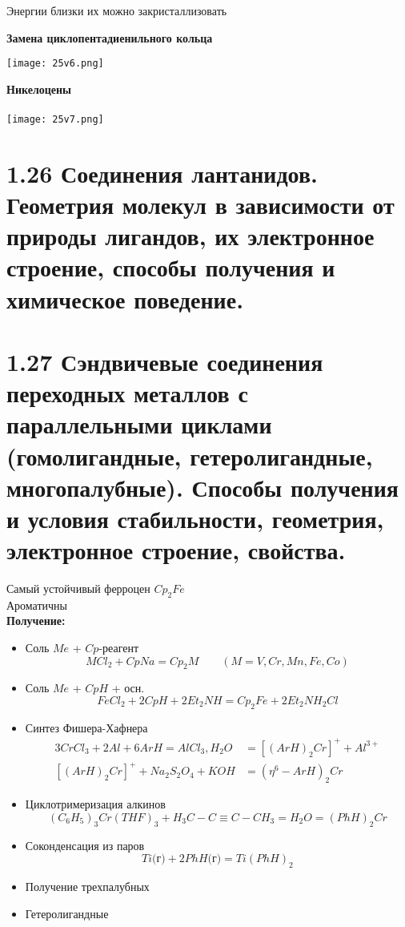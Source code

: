 Энергии близки их можно закристаллизовать

\textbf{Замена циклопентадиенильного кольца}

\texttt{[image: 25v6.png]}

\textbf{Никелоцены}\\
\\

\texttt{[image: 25v7.png]}

\section*{1.26 Соединения лантанидов. Геометрия молекул в зависимости от природы лигандов, их электронное строение, способы получения и химическое поведение.}

\section*{1.27 Сэндвичевые соединения переходных металлов с параллельными циклами (гомолигандные, гетеролигандные, многопалубные). Способы получения и условия стабильности, геометрия, электронное строение, свойства.}
\begin{figure} [H]
	\centering {\texttt{[image: xx1]}}
\end{figure}
Самый устойчивый ферроцен $Cp_2Fe$ \\
Ароматичны \\
\textbf{Получение:}\\
\begin{itemize}
	\item Соль $Me$ + $Cp$-реагент
	\[
	MCl_2 + CpNa = Cp_2M \qquad (M = V, Cr, Mn, Fe, Co)
	\]
	\item Соль $Me$ + $CpH$ + осн.
	\[
	FeCl_2 + 2CpH + 2Et_2NH = Cp_2Fe + 2Et_2NH_2Cl
	\]
	\item Синтез Фишера-Хафнера
	\begin{align*}
	3CrCl_3 + 2Al + 6ArH = AlCl_3, H_2O &= \left[(ArH)_2 Cr \right]^{+} + Al^{3+} \\
	\left[(ArH)_2 Cr \right]^{+} + Na_2S_2O_4 + KOH &= (\eta^6 - ArH)_2Cr 
	\end{align*}
	\item Циклотримеризация алкинов
	\[
	(C_6H_5)_3Cr(THF)_3 + H_3C-C\equiv C-CH_3 = H_2O = (PhH)_2Cr
	\]
	\item Соконденсация из паров
	\[
	Ti\text{(г)} + 2PhH \text{(г)} = Ti(PhH)_2
	\]
	\item Получение трехпалубных 
	\begin{figure} [H]
		\centering {\texttt{[image: xx2]}}
	\end{figure}
	\item Гетеролигандные
	\begin{figure} [H]
		\centering {\texttt{[image: xx3]}}
	\end{figure}
\end{itemize}
